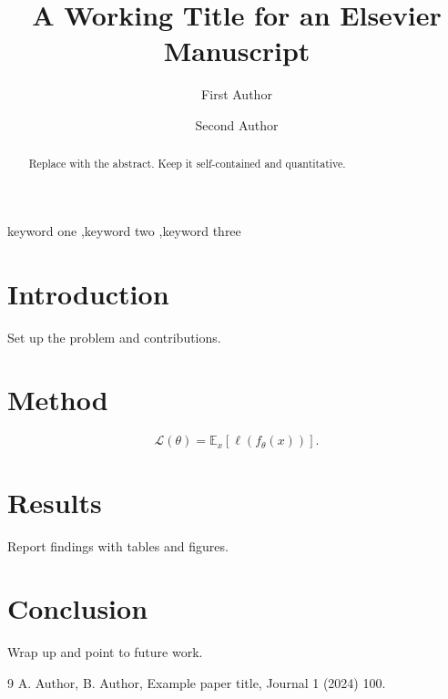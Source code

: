 \documentclass[3p,twocolumn]{elsarticle}
\begin{document}
\begin{frontmatter}
\title{A Working Title for an Elsevier Manuscript}
\author[a]{First Author}
\author[b]{Second Author}

\begin{abstract}
Replace with the abstract. Keep it self-contained and quantitative.
\end{abstract}

\begin{keyword}
keyword one \sep keyword two \sep keyword three
\end{keyword}
\end{frontmatter}

\section{Introduction}
Set up the problem and contributions.

\section{Method}
\begin{equation}
  \mathcal{L}(\theta) = \mathbb{E}_{x}\left[\ell(f_\theta(x))\right].
\end{equation}

\section{Results}
Report findings with tables and figures.

\section{Conclusion}
Wrap up and point to future work.

\begin{thebibliography}{9}
 A. Author, B. Author, Example paper title, Journal 1 (2024) 100.
\end{thebibliography}
\end{document}

